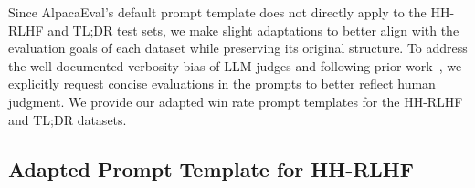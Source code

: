 Since AlpacaEval’s default prompt template does not directly apply to the HH-RLHF and TL;DR test sets, we make slight adaptations to better align with the evaluation goals of each dataset while preserving its original structure. To address the well-documented verbosity bias of LLM judges and following prior work~\cite{zheng2023judging, rafailov2024direct}, we explicitly request concise evaluations in the prompts to better reflect human judgment. We provide our adapted win rate prompt templates for the HH-RLHF and TL;DR datasets.

\subsection{Adapted Prompt Template for HH-RLHF}

